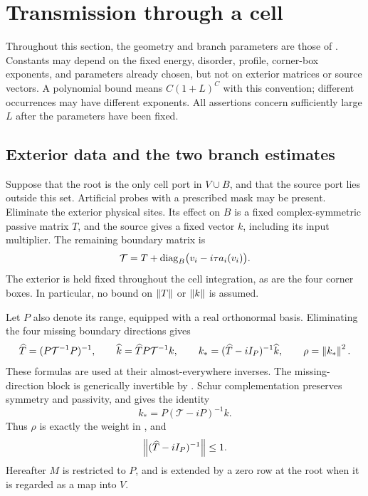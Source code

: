 \section{Transmission through a cell}
\label{sec:transmission}

Throughout this section, the geometry and branch parameters are those of
. Constants may depend on the
fixed energy, disorder, profile, corner-box exponents, and parameters
already chosen, but not on exterior matrices or source vectors. A
polynomial bound means $C(1+L)^C$ with this convention; different occurrences
may have different exponents. All assertions concern sufficiently large
$L$ after the parameters have been fixed.

\subsection{Exterior data and the two branch estimates}

Suppose that the root is the only cell port in $V\cup B$, and that the
source port lies outside this set. Artificial probes with a prescribed
mask may be present. Eliminate the exterior physical sites. Its effect
on $B$ is a fixed complex-symmetric passive matrix $T$, and the source
gives a fixed vector $k$, including its input multiplier. The remaining
boundary matrix is
\[
 \mathcal T=T+\operatorname{diag}_B\bigl(v_i-i\tau a_i(v_i)\bigr).
\]
The exterior is held fixed throughout the cell integration, as are the
four corner boxes. In particular, no bound on $\left\lVert T\right\rVert$ or $\left\lVert k\right\rVert$ is
assumed.

Let $P$ also denote its range, equipped with a real orthonormal basis.
Eliminating the four missing boundary directions gives
\begin{equation}
 \widehat T=(P\mathcal T^{-1}P)^{-1},\qquad
 \widehat k=\widehat T P\mathcal T^{-1}k,\qquad
 k_*=(\widehat T-iI_P)^{-1}\widehat k,\qquad
 \rho=\left\lVert k_*\right\rVert^2.
 \label{trans:normalization}
\end{equation}
These formulas are used at their almost-everywhere inverses. The
missing-direction block is generically invertible by
. Schur complementation
preserves symmetry and passivity, and gives the identity
\[
 k_*=P(\mathcal T-iP)^{-1}k.
\]
Thus $\rho$ is exactly the weight in , and
\begin{equation}
 \left\lVert(\widehat T-iI_P)^{-1}\right\rVert\le1.
 \label{trans:absorbed-exterior}
\end{equation}
Hereafter $M$ is restricted to $P$, and is extended by a zero row at the
root when it is regarded as a map into $V$.

